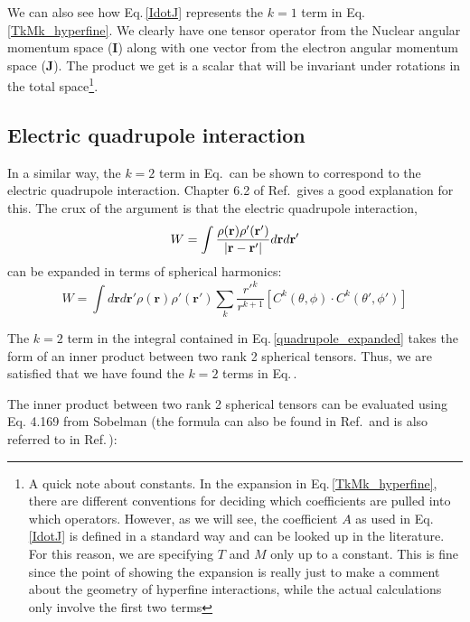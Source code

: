 We can also see how Eq.\,\ref{IdotJ} represents the $k=1$ term in Eq.\,\ref{TkMk_hyperfine}. We clearly have one tensor operator from the Nuclear angular momentum space ($\mathbf{I}$) along with one vector from the electron angular momentum space ($\mathbf{J}$). The product we get is a scalar that will be invariant under rotations in the total space\footnote{A quick note about constants. In the expansion in Eq.\,\ref{TkMk_hyperfine}, there are different conventions \cite{schwartz_hyperfine_expansion} for deciding which coefficients are pulled into which operators. However, as we will see, the coefficient $A$ as used in Eq.\,\ref{IdotJ} is defined in a standard way and can be looked up in the literature. For this reason, we are specifying $T$ and $M$ only up to a constant. This is fine since the point of showing the expansion is really just to make a comment about the geometry of hyperfine interactions, while the actual calculations only involve the first two terms}.

\subsection{Electric quadrupole interaction}
In a similar way, the $k=2$ term in Eq.\,\label{TkMk_hyperfine} can be shown to correspond to the electric quadrupole interaction. Chapter 6.2 of Ref.\,\cite{sobelman_spectra} gives a good explanation for this. The crux of the argument is that the electric quadrupole interaction,
\begin{equation}
W=\int\frac{\rho(\mathbf{r})\rho'(\mathbf{r}')}{|\mathbf{r}-\mathbf{r}'|}d\mathbf{r}d\mathbf{r'}\\
\end{equation}
can  be expanded in terms of spherical harmonics: 
\begin{equation}
W=\int d\mathbf{r}d\mathbf{r'}
\rho(\mathbf{r})\rho'(\mathbf{r}')\sum_k \frac{r'^k}{r^{k+1}}[C^k(\theta,\phi)\cdot C^k(\theta',\phi')] \label{quadrupole_expanded}
\end{equation}

The $k=2$ term in the integral contained in Eq.\,\ref{quadrupole_expanded} takes the form of an inner product between two rank 2 spherical tensors. Thus, we are satisfied that we have found the $k=2$ terms in Eq.\,\cite{TkMk_hyperfine}.

The inner product between two rank 2 spherical tensors can be evaluated using Eq. 4.169 from Sobelman \cite{sobelman_spectra} (the formula can also be found in Ref.\,\cite{Racah2} and is also referred to in Ref.\,\cite{schwartz_hyperfine_expansion}):

